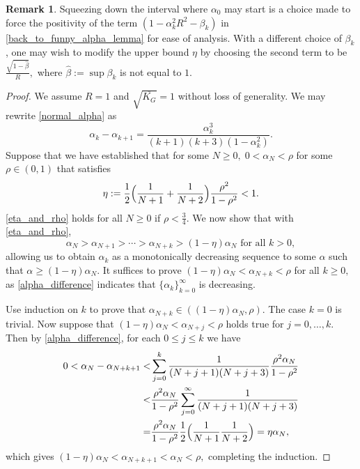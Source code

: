 \documentclass[11pt,reqno,oneside]{amsart}
\theoremstyle{definition}
\newtheorem{remark}[theorem]{Remark}
\numberwithin{equation}{section}
\begin{document}
\begin{remark}
    Squeezing down the interval where $\alpha_{0}$ may start is a choice made to force the positivity of the term $(1 - \alpha_{k}^{2}R^{2} - \beta_{k})$ in \eqref{back_to_funny_alpha_lemma} for ease of analysis.
    With a different choice of $\beta_{k}$, one may wish to modify the upper bound $\eta$ by choosing the second term to be $\displaystyle \frac{\sqrt{1 - \hat{\beta}}}{R},$ where $\hat{\beta} := \sup \beta_{k}$ is not equal to $1.$
\end{remark}

\begin{proof}
    We assume $R = 1$ and $\sqrt{\overline{K_{G}}} = 1$ without loss of generality.
    We may rewrite \eqref{normal_alpha} as
    \begin{equation}
        \alpha_{k} - \alpha_{k+1} = \frac{\alpha_{k}^{3}}{(k+1)(k+3)(1 - \alpha_{k}^{2})}. \label{alpha_difference}
    \end{equation}
    Suppose that we have established that for some $N \geq 0, \; 0 < \alpha_{N} < \rho$ for some $\rho \in (0,1)$ that satisfies 
    \begin{equation}
        \eta := \frac{1}{2}\Big{(}\frac{1}{N + 1} + \frac{1}{N+2} \Big{)}\frac{\rho^{2}}{1-\rho^{2}} < 1. \label{eta_and_rho}
    \end{equation}
    \eqref{eta_and_rho} holds for all $N \geq 0$ if $\rho < \frac{3}{4}.$
    We now show that with \eqref{eta_and_rho},
    \begin{equation*}
        \alpha_{N} > \alpha_{N+1} > \cdots > \alpha_{N+k} > (1-\eta)\alpha_{N} \text{ for all }k > 0,
    \end{equation*}
    allowing us to obtain $\alpha_{k}$ as a monotonically decreasing sequence to some $\alpha$ such that $\alpha \geq (1-\eta)\alpha_{N}$.
    It suffices to prove $(1-\eta)\alpha_{N} < \alpha_{N+k} < \rho$ for all $k \geq 0,$ as \eqref{alpha_difference} indicates that $\{\alpha_{k}\}_{k=0}^{\infty}$ is decreasing.

    Use induction on $k$ to prove that $\alpha_{N+k} \in ((1-\eta)\alpha_{N},\rho)$.
    The case $k=0$ is trivial.
    Now suppose that $(1-\eta)\alpha_{N} < \alpha_{N+j} < \rho$ holds true for $j = 0, \ldots, k.$
    Then by \eqref{alpha_difference}, for each $0 \leq j \leq k$ we have
    \begin{align*}
        0 < \alpha_{N} - \alpha_{N+k+1} <& \sum_{j=0}^{k} \frac{1}{(N+j+1)(N+j+3)} \frac{\rho^{2}\alpha_{N}}{1-\rho^{2}} \\
        <& \frac{\rho^{2}\alpha_{N}}{1-\rho^{2}} \sum_{j=0}^{\infty} \frac{1}{(N+j+1)(N+j+3)} \\
        =& \frac{\rho^{2}\alpha_{N}}{1-\rho^{2}} \frac{1}{2} \Big{(} \frac{1}{N+1} \frac{1}{N+2}\Big{)} = \eta \alpha_{N},
    \end{align*}
    which gives $(1-\eta) \alpha_{N} < \alpha_{N+k+1} < \alpha_{N} < \rho,$ completing the induction.
\end{proof}
\end{document}
